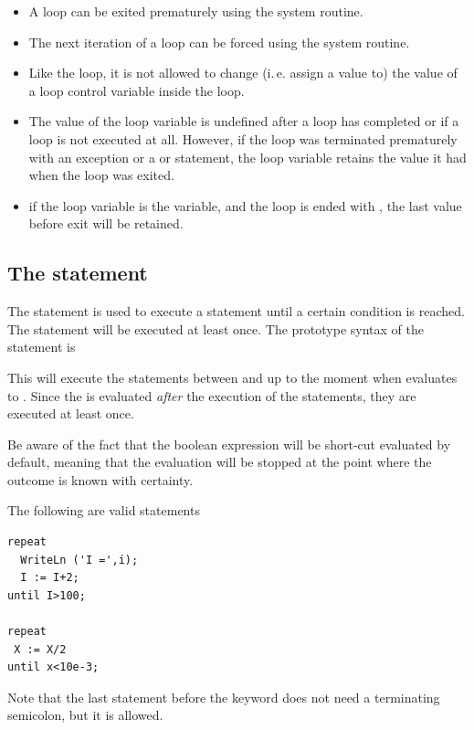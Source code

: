 \begin{remark}
\begin{itemize}
\item A loop can be exited prematurely using the  system routine.
\item The next iteration of a loop can be forced using the  system routine.
\item Like the  loop, it is not allowed to change (i.\,e. assign a value to) the value of a
loop control variable inside the loop.
\item The value of the loop variable is undefined after a loop has completed or if a loop is not executed at all.
However, if the loop was terminated prematurely with an exception or a  or  statement,
the loop variable retains the value it had when the loop was exited.
\item if the loop variable is the  variable, and the loop is
ended with , the last value before exit will be retained.
\end{itemize}
\end{remark}

\subsection{The  statement}
 
The  statement is used to execute a statement until a certain
condition is reached. The statement will be executed at least once.
The prototype syntax of the  statement is

This will execute the statements between  and  up to
the moment when  evaluates to .
Since the  is evaluated {\em after} the execution of the
statements, they are executed at least once.

Be aware of the fact that the boolean expression  will be
short-cut evaluated by default, meaning that the evaluation will be stopped
at the point where the outcome is known with certainty.

The following are valid  statements
\begin{verbatim}
repeat
  WriteLn ('I =',i);
  I := I+2;
until I>100;

repeat
 X := X/2
until x<10e-3;
\end{verbatim}
Note that the last statement before the  keyword does not need
a terminating semicolon, but it is allowed.


